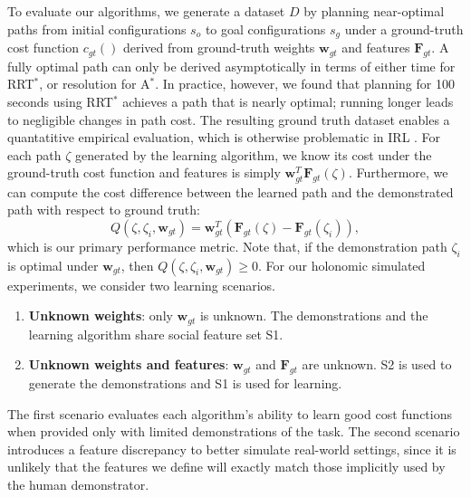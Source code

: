 \documentclass[letterpaper, 10 pt, conference]{ieeeconf}
\begin{document}
	To evaluate our algorithms, we generate a dataset $D$ by planning near-optimal paths from initial configurations $s_o$ to goal configurations $s_g$ under a ground-truth cost function $c_{gt}()$ derived from ground-truth weights $\mathbf{w}_{gt}$ and features $\mathbf{F}_{gt}$. A fully optimal path can only be derived asymptotically in terms of either time  for RRT$^*$, or resolution for A$^*$. In practice, however, we found that planning for 100 seconds using  RRT$^*$  achieves a path that is nearly optimal; running longer leads to negligible changes in path cost. 
	The resulting ground truth dataset enables a quantatitive empirical evaluation, which is otherwise problematic in IRL \cite{shiarlis2016inverse,vasquez2014inverse}. For each path $\zeta$ generated by the learning algorithm, we know its cost under the ground-truth cost function and features is simply  $\mathbf{w}_{gt}^T\mathbf{F}_{gt}(\zeta)$. Furthermore, we can compute the cost difference between the learned path and the demonstrated path with respect to ground truth:
	\begin{equation}
		Q(\zeta,\zeta_i,\mathbf{w}_{gt}) = \mathbf{w}_{gt}^T(\mathbf{F}_{gt}(\zeta)-\mathbf{F}_{gt}(\zeta_i)), \label{eq:obj_eval}
	\end{equation}
which is our primary performance metric.  Note that, if the demonstration path $\zeta_i$ is optimal under $\mathbf{w}_{gt}$, then $Q(\zeta,\zeta_i,\mathbf{w}_{gt}) \geq 0$. For our holonomic simulated experiments, we consider two learning scenarios.
\begin{enumerate}
	\item \textbf{Unknown weights}: only $\mathbf{w}_{gt}$ is unknown. The demonstrations and the learning algorithm share social feature set S1.
	\item \textbf{Unknown weights and features}: $\mathbf{w}_{gt}$ and $\mathbf{F}_{gt}$  are unknown. S2 is used to generate the demonstrations and S1 is used for learning.
\end{enumerate}

The first scenario evaluates each algorithm's ability to learn good cost functions when provided only with limited demonstrations of the task. The second scenario introduces a feature discrepancy to better simulate real-world settings, since it is unlikely that the features we define will exactly match those implicitly used by the human demonstrator.
\end{document}
